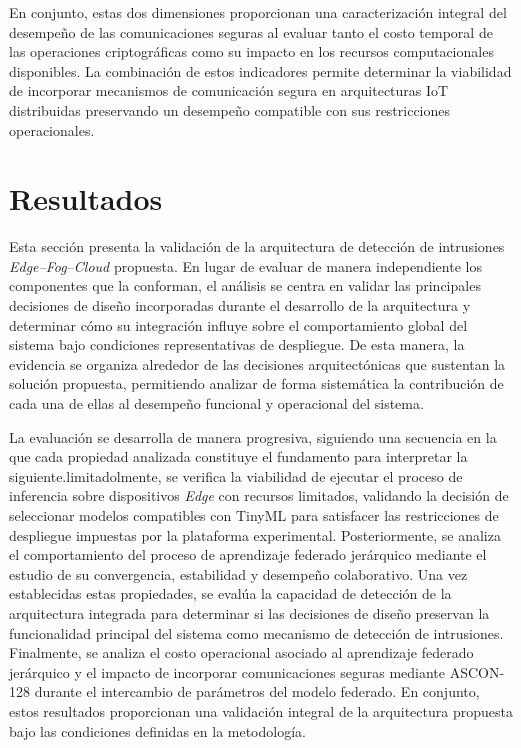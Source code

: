 \documentclass[journal,article,submit,moreauthors]{Definitions/mdpi}
\begin{document}
En conjunto, estas dos dimensiones proporcionan una caracterización integral del desempeño de las comunicaciones seguras al evaluar tanto el costo temporal de las operaciones criptográficas como su impacto en los recursos computacionales disponibles. La combinación de estos indicadores permite determinar la viabilidad de incorporar mecanismos de comunicación segura en arquitecturas IoT distribuidas preservando un desempeño compatible con sus restricciones operacionales.

\section{Resultados}
Esta sección presenta la validación de la arquitectura de detección de intrusiones \textit{Edge--Fog--Cloud} propuesta. En lugar de evaluar de manera independiente los componentes que la conforman, el análisis se centra en validar las principales decisiones de diseño incorporadas durante el desarrollo de la arquitectura y determinar cómo su integración influye sobre el comportamiento global del sistema bajo condiciones representativas de despliegue. De esta manera, la evidencia se organiza alrededor de las decisiones arquitectónicas que sustentan la solución propuesta, permitiendo analizar de forma sistemática la contribución de cada una de ellas al desempeño funcional y operacional del sistema.

La evaluación se desarrolla de manera progresiva, siguiendo una secuencia en la que cada propiedad analizada constituye el fundamento para interpretar la siguiente.limitadolmente, se verifica la viabilidad de ejecutar el proceso de inferencia sobre dispositivos \textit{Edge} con recursos limitados, validando la decisión de seleccionar modelos compatibles con TinyML para satisfacer las restricciones de despliegue impuestas por la plataforma experimental. Posteriormente, se analiza el comportamiento del proceso de aprendizaje federado jerárquico mediante el estudio de su convergencia, estabilidad y desempeño colaborativo. Una vez establecidas estas propiedades, se evalúa la capacidad de detección de la arquitectura integrada para determinar si las decisiones de diseño preservan la funcionalidad principal del sistema como mecanismo de detección de intrusiones. Finalmente, se analiza el costo operacional asociado al aprendizaje federado jerárquico y el impacto de incorporar comunicaciones seguras mediante ASCON-128 durante el intercambio de parámetros del modelo federado. En conjunto, estos resultados proporcionan una validación integral de la arquitectura propuesta bajo las condiciones definidas en la metodología.
\end{document}
